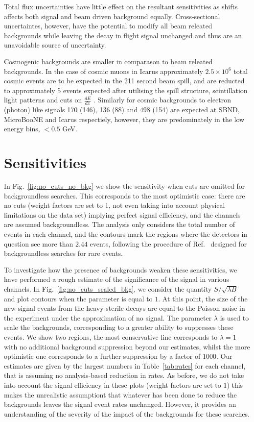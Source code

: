 \documentclass[11pt, a4paper]{article}
\newcommand{\reffig}[1]{Fig.~\ref{#1}}
\newcommand{\reftab}[1]{Table~\ref{#1}}
\newcommand{\refref}[1]{Ref.~\cite{#1}}
\begin{document}
Total flux uncertainties have little effect on the resultant sensitivities as shifts affects both signal and beam driven background equally. Cross-sectional uncertaintes, however, have the potential to modify all beam releated backgrounds while leaving the decay in flight signal unchanged and thus are an unavoidable source of uncertainty.

Cosmogenic backgrounds are smaller in comparason to beam releated backgrounds. In the case of cosmic muons in Icarus approximately $2.5 \times 10^{6}$  total cosmic events are to be expected in the 211 second beam spill, and are reducted to approximately 5 events expected after utilising the spill structure, scintillation light patterns and cuts on $\frac{d E}{d x}$ \cite{Antonello:2015lea}. Similarly for cosmic backgrounds to electron (photon) like signals 170 (146), 136 (88) and 498 (154) are expected at SBND, MicroBooNE and Icarus respectiely, however, they are predominately in the low energy bins, $< 0.5$ GeV.


\section{Sensitivities}

In \reffig{fig:no_cuts_no_bkg} we show the sensitivity when cuts are omitted
for backgroundless searches. This corresponds to the most optimistic case:
there are no cuts (weight factors are set to $1$, not even taking into account
physical limitations on the data set) implying perfect signal efficiency, and
the channels are assumed backgroundless.
%
The analysis only considers the total number of events in each channel, and the
contours mark the regions where the detectors in question see more than $2.44$
events, following the procedure of \refref{Feldman:1997qc} designed for
backgroundless searches for rare events. 

To investigate how the presence of backgrounds weaken these sensitivities, we
have performed a rough estimate of the significance of the signal in various
channels. In \reffig{fig:no_cuts_scaled_bkg}, we consider the quantity
$S/\sqrt{\lambda B}$ and plot contours when the parameter is equal to $1$. At
this point, the size of the new signal events from the heavy sterile decays are
equal to the Poisson noise in the experiment under the approximation of no
signal. The parameter $\lambda$ is used to scale the backgrounds, corresponding
to a greater ability to suppresses these events.  We show two regions, the most
conservative line corresponds to $\lambda=1$ with no additional background
suppression beyond our estimates, whilst the more optimistic one corresponds to
a further suppression by a factor of 1000. Our estimates are given by the
largest numbers in \reftab{tab:rates} for each channel, that is assuming no
analysis-based reduction in rates. As before, we do not take into account the
signal efficiency in these plots (weight factors are set to $1$) this makes the
unrealistic assumptiont that whatever has been done to reduce the backgrounds
leaves the signal event rates unchanged. However, it provides an understanding of 
the severity of the impact of the backgrounds for these searches.
\end{document}
